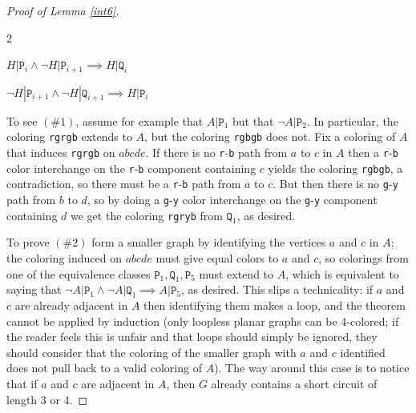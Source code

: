\documentclass[11pt]{article}
\newcommand{\cR}{\texttt{r}}
\newcommand{\cG}{\texttt{g}}
\newcommand{\cB}{\texttt{b}}
\newcommand{\cY}{\texttt{y}}
\newcommand{\rA}[1]{\texttt{P}_{{#1}}}
\newcommand{\rB}[1]{\texttt{Q}_{#1}}
\newcommand{\gH}{A}
\begin{document}
\begin{proof}[Proof of Lemma \ref{int6}]
	  {
	  \renewcommand{\theenumi}{\arabic{enumi}}
	  \renewcommand{\labelenumi}{(\theenumi)}
	  \begin{list}{2}{
	    \setlength{\itemindent}{23pt}
	    \setlength{\itemsep}{0pt}
	    \setlength{\parskip}{-100pt}
            \setlength{\leftmargin}{0pt}}
\vspace{-1ex}
\item[(\#1)] $H|\rA{i} \wedge \neg H|\rA{i+1} \implies H|\rB{i}$
\item[(\#2)] $\neg H|\rA{i+1} \wedge \neg H|\rB{i+1} \implies H|\rA{i}$
\vspace{-0.5ex}
           \end{list}
          }

\noindent To see $(\#1)$, assume for example that $\gH|\rA{1}$ but that $\neg \gH|\rA{2}$. In particular, the coloring \cR\cG\cR\cG\cB{} extends to $\gH$, but the coloring \cR\cG\cB\cG\cB{} does not. Fix a coloring of $\gH$ that induces \cR\cG\cR\cG\cB{} on $abcde$. If there is no \cR-\cB{} path from $a$ to $c$ in $\gH$ then a \cR-\cB{} color interchange on the \cR-\cB{} component containing $c$ yields the coloring \cR\cG\cB\cG\cB{}, a contradiction, so there must be a \cR-\cB{} path from $a$ to $c$. But then there
is no \cG-\cY{} path from $b$ to $d$, so by doing a \cG-\cY{} color interchange on the \cG-\cY{} component containing $d$ we get the coloring \cR\cG\cR\cY\cB{} from $\rB{1}$, as desired. 

To prove $(\#2)$ form a smaller graph by identifying the vertices $a$ and $c$ in $\gH$; the coloring induced on $abcde$ must give equal colors to $a$ and $c$, so colorings from one of the equivalence classes $\rA{1}, \rB{1}, \rA{5}$ must extend to $\gH$, which is equivalent to saying that $\neg \gH|\rA{1} \wedge \neg \gH|\rB{1} \implies \gH|\rA{5}$, as desired. This slips a technicality: if $a$ and $c$ are already adjacent in $\gH$ then identifying them makes a loop, and the theorem cannot be applied by induction (only loopless planar graphs can be 4-colored; if the reader feels this is unfair and that loops should simply be ignored, they should consider that the coloring of the smaller graph with $a$ and $c$ identified does not pull back to a valid coloring of $\gH$). The way around this case is to notice that if $a$ and $c$ are adjacent in $\gH$, then $G$ already contains a short circuit of length 3 or 4.


\end{proof}
\end{document}

